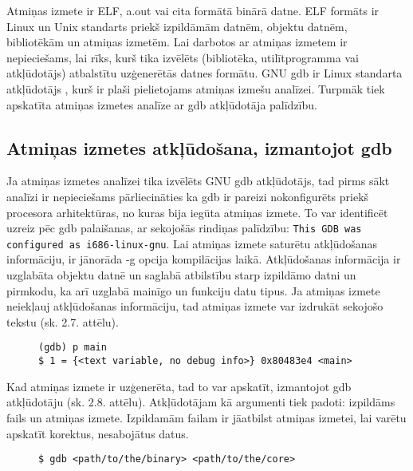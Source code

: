 Atmiņas izmete ir ELF, a.out vai cita formātā binārā  datne. 
ELF formāts ir Linux un Unix standarts priekš izpildāmām datnēm, objektu datnēm, bibliotēkām un atmiņas izmetēm.
Lai darbotos ar atmiņas izmetem ir nepieciešams, lai rīks, kurš tika izvēlēts (bibliotēka, utilītprogramma vai atkļūdotājs) atbalstītu uzģenerētās datnes formātu.
GNU gdb ir  Linux standarta atkļūdotājs \cite{MWMK}, kurš ir plaši pielietojams atmiņas izmešu analīzei. 
Turpmāk tiek apskatīta atmiņas izmetes analīze ar gdb atkļūdotāja palīdzību.

\subsection{Atmiņas izmetes atkļūdošana, izmantojot gdb }
 \label{subsec:debugg_gdb}
Ja atmiņas izmetes analīzei tika izvēlēts GNU gdb atkļūdotājs, tad pirms sākt analīzi ir nepieciešams pārliecināties ka gdb ir pareizi nokonfigurēts priekš procesora arhitektūras, no kuras bija iegūta atmiņas izmete.
To var identificēt uzreiz pēc gdb palaišanas, ar sekojošās rindiņas palīdzību: \texttt{This GDB was configured as i686-linux-gnu}.  
Lai atmiņas izmete saturētu atkļūdošanas informāciju, ir jānorāda -g opcija kompilācijas laikā.
Atkļūdošanas informācija ir uzglabāta objektu datnē un saglabā atbilstību starp izpildāmo datni un pirmkodu, ka arī uzglabā mainīgo un funkciju datu tipus.
Ja atmiņas izmete neiekļauj atkļūdošanas informāciju, tad atmiņas izmete var izdrukāt sekojošo tekstu (sk. 2.7. attēlu).

\begin{figure}[h]
\begin{lstlisting}[style=customgdb]
(gdb) p main
$ 1 = {<text variable, no debug info>} 0x80483e4 <main>
\end{lstlisting}
\caption{\textbf{\fontsize{11}{12}\selectfont {Atmiņas izmete nesatur atkļūdošanas informāciju}}}
\end{figure}

Kad atmiņas izmete ir uzģenerēta, tad to var apskatīt, izmantojot gdb atkļūdotāju (sk. 2.8. attēlu). 
Atkļūdotājam kā argumenti tiek padoti: izpildāms fails un atmiņas izmete. 
Izpildamām failam ir jāatbilst atmiņas izmetei, lai varētu apskatīt korektus, nesabojātus datus.

\begin{figure}[h]
\begin{lstlisting}[style=customgdb]
$ gdb <path/to/the/binary> <path/to/the/core>
\end{lstlisting}
\caption{\textbf{\fontsize{11}{12}\selectfont {Atmiņas izmetes atvēršana, izmantojot gdb atkļūdotāju}}}
\end{figure}

